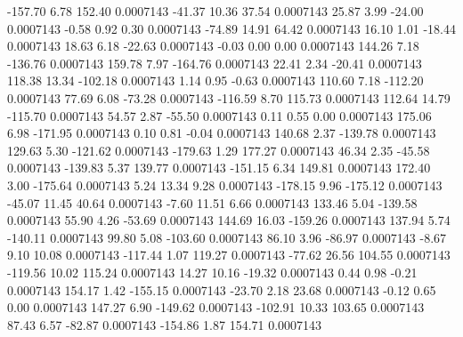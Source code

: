      -157.70        6.78      152.40     0.0007143
      -41.37       10.36       37.54     0.0007143
       25.87        3.99      -24.00     0.0007143
       -0.58        0.92        0.30     0.0007143
      -74.89       14.91       64.42     0.0007143
       16.10        1.01      -18.44     0.0007143
       18.63        6.18      -22.63     0.0007143
       -0.03        0.00        0.00     0.0007143
      144.26        7.18     -136.76     0.0007143
      159.78        7.97     -164.76     0.0007143
       22.41        2.34      -20.41     0.0007143
      118.38       13.34     -102.18     0.0007143
        1.14        0.95       -0.63     0.0007143
      110.60        7.18     -112.20     0.0007143
       77.69        6.08      -73.28     0.0007143
     -116.59        8.70      115.73     0.0007143
      112.64       14.79     -115.70     0.0007143
       54.57        2.87      -55.50     0.0007143
        0.11        0.55        0.00     0.0007143
      175.06        6.98     -171.95     0.0007143
        0.10        0.81       -0.04     0.0007143
      140.68        2.37     -139.78     0.0007143
      129.63        5.30     -121.62     0.0007143
     -179.63        1.29      177.27     0.0007143
       46.34        2.35      -45.58     0.0007143
     -139.83        5.37      139.77     0.0007143
     -151.15        6.34      149.81     0.0007143
      172.40        3.00     -175.64     0.0007143
        5.24       13.34        9.28     0.0007143
     -178.15        9.96     -175.12     0.0007143
      -45.07       11.45       40.64     0.0007143
       -7.60       11.51        6.66     0.0007143
      133.46        5.04     -139.58     0.0007143
       55.90        4.26      -53.69     0.0007143
      144.69       16.03     -159.26     0.0007143
      137.94        5.74     -140.11     0.0007143
       99.80        5.08     -103.60     0.0007143
       86.10        3.96      -86.97     0.0007143
       -8.67        9.10       10.08     0.0007143
     -117.44        1.07      119.27     0.0007143
      -77.62       26.56      104.55     0.0007143
     -119.56       10.02      115.24     0.0007143
       14.27       10.16      -19.32     0.0007143
        0.44        0.98       -0.21     0.0007143
      154.17        1.42     -155.15     0.0007143
      -23.70        2.18       23.68     0.0007143
       -0.12        0.65        0.00     0.0007143
      147.27        6.90     -149.62     0.0007143
     -102.91       10.33      103.65     0.0007143
       87.43        6.57      -82.87     0.0007143
     -154.86        1.87      154.71     0.0007143
